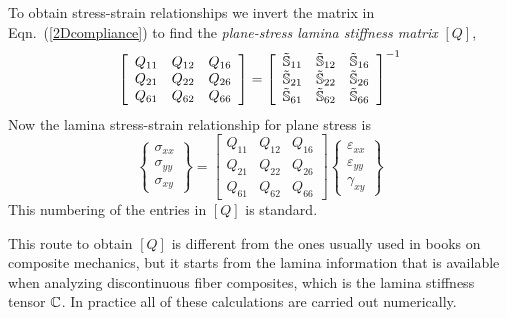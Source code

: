 \documentclass[11pt]{article}
\begin{document}
 To obtain stress-strain relationships we invert the matrix in Eqn.~(\ref{2Dcompliance}) to find the \emph{plane-stress lamina stiffness matrix} $[Q]$,
 \begin{equation}
   \left[ \begin{array}{ccc}
     Q_{11} &  Q_{12} &   Q_{16} \\
     Q_{21} &  Q_{22} &   Q_{26} \\
     Q_{61} &  Q_{62} &   Q_{66} 
    \end{array} \right] 
    =
              \left[ \begin{array}{ccc}
     \tilde{\mathbb{S}}_{11} &  \tilde{\mathbb{S}}_{12} &   \tilde{\mathbb{S}}_{16} \\
     \tilde{\mathbb{S}}_{21} &  \tilde{\mathbb{S}}_{22} &   \tilde{\mathbb{S}}_{26} \\
     \tilde{\mathbb{S}}_{61} &  \tilde{\mathbb{S}}_{62} &   \tilde{\mathbb{S}}_{66} 
    \end{array} \right]  ^{-1}
    \label{Qdef}
 \end{equation}
 Now the lamina stress-strain relationship for plane stress is
 \begin{equation}
    \left\{ \begin{array}{c}
           \sigma_{xx}  \\  \sigma_{yy}  \\   \sigma_{xy}
           \end{array} \right\}
           =
              \left[ \begin{array}{ccc}
     Q_{11} &  Q_{12} &   Q_{16} \\
     Q_{21} &  Q_{22} &   Q_{26} \\
     Q_{61} &  Q_{62} &   Q_{66} 
    \end{array} \right] 
        \left\{ \begin{array}{c}
           \varepsilon_{xx}  \\  \varepsilon_{yy}  \\  \gamma_{xy}
           \end{array} \right\}
     \label{laminaQ}
 \end{equation}
This numbering of the entries in $[Q]$ is standard.  

This route to obtain $[Q]$ is different from the ones usually used in books on composite mechanics, but it starts from the lamina information that is available when analyzing discontinuous fiber composites, which is the lamina stiffness tensor $\mathbf{\mathbb{C}}$.  In practice all of these calculations are carried out numerically.
\end{document}
